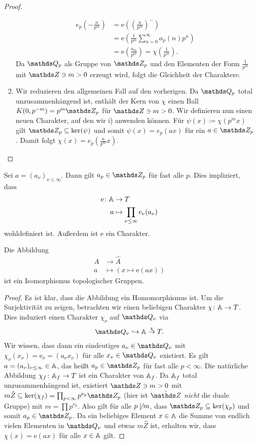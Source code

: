 \begin{proof}
\begin{enumerate}[label=\roman*)]
\begin{align*}
e_p\left(-\frac{a}{p^m}\right)&=\mathrm{e}\left(\left(\frac{a}{p^m}\right)^-\right)\\
&=\mathrm{e}\left(\frac{1}{p^m}\sum_{n=0}^\infty a_p(n)p^n\right)\\
&=\mathrm{e}\left(\frac{a_m}{p^m}\right)=\chi\left(\frac{1}{p^m}\right).
\end{align*}
Da $\Q_p$ als Gruppe von $\Z_p$ und den Elementen der Form $\frac{1}{p^m}$ mit $\Z \ni m>0$ erzeugt wird, folgt die Gleichheit der Charaktere.
\item Wir reduzieren den allgemeinen Fall auf den vorherigen.
Da $\Q_p$ total unzusammenhängend ist, enthält der Kern von $\chi$ einen Ball $K(0,p^{-m})=p^m \Z_p$ für $\Z \ni m>0$.
Wir definieren nun einen neuen Charakter, auf den wir i) anwenden können.
Für $\psi(x)\coloneqq \chi(p^mx)$ gilt $\Z_p \subseteq \ker(\psi)$ und somit $\psi(x)=e_p(ax)$ für ein $a\in \Z_p$.
Damit folgt $\chi(x)=e_p(\frac{a}{p^m}x)$. \qedhere
\end{enumerate}
\end{proof}

Sei $a=(a_\nu)_{\nu \leq \infty}$. Dann gilt $a_p \in \Z_p$ für fast alle $p$.
Dies impliziert, dass
\begin{align*}
\mathrm{e}\colon \mathbb{A} &\to T\\
a &\mapsto \prod_{\nu \leq \infty} \mathrm{e}_\nu(a_\nu) 
\end{align*}
wohldefiniert ist. Außerdem ist $\mathrm{e}$ ein Charakter.

\begin{prop}
Die Abbildung
\begin{align*}
A &\to \hat{A}\\
a&\mapsto (x \mapsto \mathrm{e}(ax))
\end{align*}
ist ein Isomorphismus topologischer Gruppen.
\end{prop}
\begin{proof}
Es ist klar, dass die Abbildung ein Homomorphismus ist.
Um die Surjektivität zu zeigen, betrachten wir einen beliebigen Charakter $\chi \colon \mathbb{A} \to T$.
Dies induziert einen Charakter $\chi_\nu$ auf $\Q_\nu$ via
\begin{align*}
\Q_\nu \hookrightarrow \A \overset{\chi}{\to} T.
\end{align*}
Wir wissen, dass dann ein eindeutiges $a_\nu \in \Q_\nu$ mit $\chi_\nu(x_\nu)=\mathrm{e}_\nu=(a_\nu x_\nu)$ für alle $x_\nu \in \Q_\nu$ existiert.
Es gilt $a=(a_\nu)_{\nu \leq \infty}\in \mathbb{A}$, das heißt $a_p \in \Z_p$ für fast alle $p<\infty$.
Die natürliche Abbildung $\chi_f \colon \mathbb{A}_f \to T$ ist ein Charakter von $\mathbb{A}_f$.
Da $\mathbb{A}_f$ total unzusammenhängend ist, existiert $\Z \ni m >0$ mit
$m \hat{Z} \subseteq \ker(\chi_f)=\prod_{p<\infty} p^{\nu_p} \Z_p$ (hier ist $\hat{\Z}$ \emph{nicht} die duale Gruppe) mit $m=\prod p^{\nu_p}$.
Also gilt für alle $p \not \mid m$, dass $\Z_p \subseteq \ker(\chi_p)$ und somit $a_p \in \Z_p$.
Da ein beliebiges Element $x\in \mathbb{A}$ die Summe von endlich vielen Elementen in $\Q_\nu$ und etwas $m\hat{Z}$ ist, erhalten wir, dass $\chi(x)=\mathrm{e}(ax)$ für alle $x\in \mathbb{A}$ gilt.
\end{proof}

